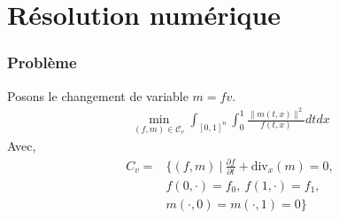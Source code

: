 \documentclass{beamer}
\begin{document}
  \section{Résolution numérique}
\begin{frame}\frametitle{Problème}
Posons le changement de variable $m=fv$. 
	\begin{align*}
	\min_{(f,m)\in\mathcal{C}_v}\int_{[0,1]^n}\int_0^1 \frac{\|m(t,x)\|^2}{f(t,x)}dtdx
	\end{align*}
Avec,
	\begin{align*}
	C_v=&\{(f,m)\ |\ \frac{\partial f}{\partial t} + \text{div}_x (m) =0,\\
	&f(0,\cdot) = f_0,\ f(1,\cdot)=f_1,\\
	&m(\cdot,0) = m(\cdot,1)=0 \}
	\end{align*}
\end{frame}
\end{document}
